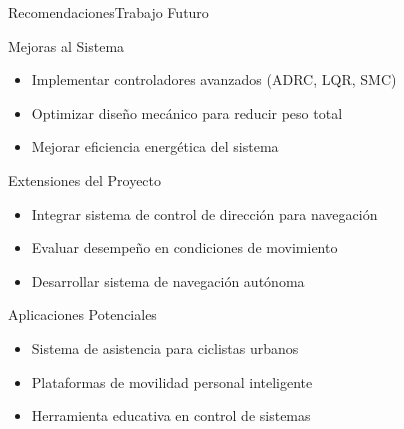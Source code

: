 \documentclass[10pt,xcolor={dvipsnames}]{beamer}
\begin{document}
\begin{frame}{Recomendaciones}{Trabajo Futuro}

\begin{block}{Mejoras al Sistema}
\begin{itemize}
    \item Implementar controladores avanzados (ADRC, LQR, SMC)
    \item Optimizar diseño mecánico para reducir peso total
    \item Mejorar eficiencia energética del sistema
\end{itemize}
\end{block}

\begin{block}{Extensiones del Proyecto}
\begin{itemize}
    \item Integrar sistema de control de dirección para navegación
    \item Evaluar desempeño en condiciones de movimiento
    \item Desarrollar sistema de navegación autónoma
\end{itemize}
\end{block}

\begin{block}{Aplicaciones Potenciales}
\begin{itemize}
    \item Sistema de asistencia para ciclistas urbanos
    \item Plataformas de movilidad personal inteligente
    \item Herramienta educativa en control de sistemas
\end{itemize}
\end{block}
\end{frame}
\end{document}
